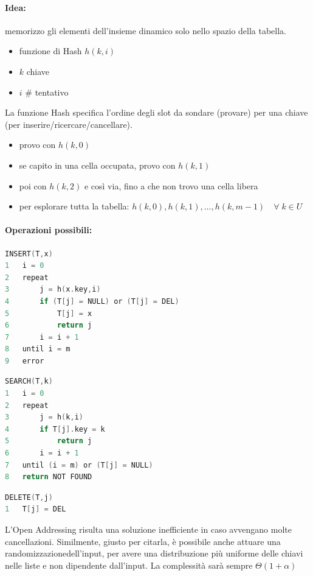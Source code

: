 \paragraph{Idea:} memorizzo gli elementi dell'insieme dinamico solo nello spazio della tabella.
\begin{itemize}
    \item funzione di Hash $h(k,i)$
    \item $k$ chiave
    \item $i$ \# tentativo
\end{itemize}
La funzione Hash specifica l'ordine degli slot da sondare (provare) per una chiave (per inserire/ricercare/cancellare).
\begin{itemize}
    \item provo con $h(k,0)$
    \item se capito in una cella occupata, provo con $h(k,1)$
    \item poi con $h(k,2)$ e così via, fino a che non trovo una cella libera
    \item per esplorare tutta la tabella: $h(k,0), h(k,1), \dots, h(k,m-1) \quad \forall\; k \in U$
\end{itemize}

\paragraph{Operazioni possibili:}
\begin{mdframed}
\begin{lstlisting}[language=C]
INSERT(T,x)
1   i = 0
2   repeat
3       j = h(x.key,i)
4       if (T[j] = NULL) or (T[j] = DEL)
5           T[j] = x
6           return j
7       i = i + 1
8   until i = m
9   error
\end{lstlisting}
\end{mdframed}
\begin{mdframed}
\begin{lstlisting}[language=C]
SEARCH(T,k)
1   i = 0
2   repeat
3       j = h(k,i)
4       if T[j].key = k
5           return j
6       i = i + 1
7   until (i = m) or (T[j] = NULL)
8   return NOT FOUND
\end{lstlisting}
\end{mdframed}
\begin{mdframed}
\begin{lstlisting}[language=C]
DELETE(T,j)
1   T[j] = DEL
\end{lstlisting}
\end{mdframed}

L'Open Addressing risulta una soluzione inefficiente in caso avvengano molte cancellazioni. Similmente, giusto per citarla, è possibile anche attuare una randomizzazionedell'input, per avere una distribuzione più uniforme delle chiavi nelle liste e non dipendente dall'input. La complessità sarà sempre $\Theta(1+\alpha)$
